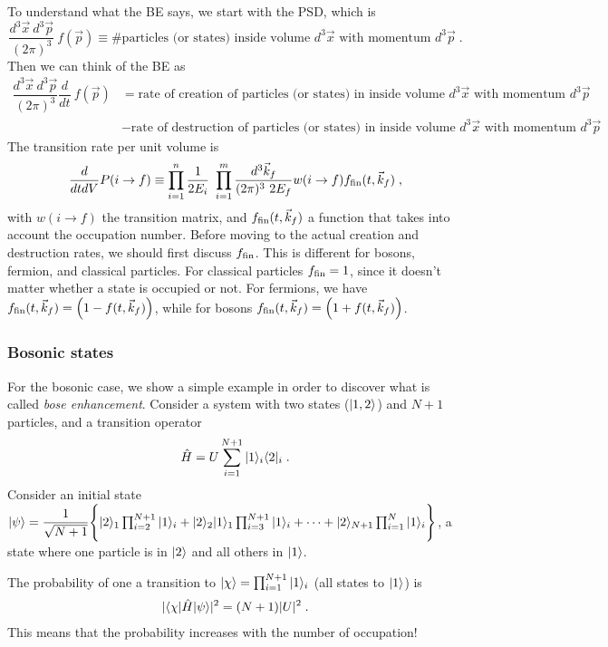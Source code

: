\documentclass[11pt,a4paper]{article}
\begin{document}
To understand what the BE says, we start with the PSD, which is
%
\begin{equation}
	\dfrac{d^3 \vec{x} \ d^3 \vec{p}}{(2\pi)^3} \ f(\vec{p})  \equiv \# \text{particles (or states) inside volume $d^3 \vec{x}$ with momentum $d^3 \vec{p}$} \;.
	\label{eq:PSD_description}
\end{equation}
%
Then we can think of the BE as  
%
\begin{align}
	\dfrac{d^3 \vec{x} \ d^3 \vec{p}}{(2\pi)^3}	\dfrac{d}{dt}  \ f(\vec{p})  &= 
	\text{rate of creation of particles (or states) in  inside volume $d^3 \vec{x}$ with momentum $d^3 \vec{p}$} \nonumber \\
	&-\text{rate of destruction of particles (or states) in  inside volume $d^3 \vec{x}$ with momentum $d^3 \vec{p}$} \;.
	\label{eq:BE_description}
\end{align}
%
The transition rate per unit volume is 
%
$$
\dfrac{d}{dt dV} P(i\to f) \equiv \prod_{i=1}^{n} \dfrac{1}{2E_{i}} \ \prod_{i=1}^{m} \dfrac{d^3\vec{k}_f}{(2\pi)^3 \ 2E_{f}}  w(i\to f) 
f_{\rm fin}(t,\vec{k}_f)  \;,
$$
%
with $w(i\to f)$ the transition matrix, and $f_{\rm fin}(t,\vec{k}_f)$ a function that takes into account the occupation number. Before moving to the actual creation and destruction rates, we should first discuss $f_{\rm fin}$. This is different for bosons, fermion, and classical particles. For classical particles $f_{\rm fin} = 1$, since it doesn't matter whether a state is occupied or not. For fermions, we have $f_{\rm fin}(t,\vec{k}_f) =\left( 1 -  f(t, \vec{k}_f )  \right)$, while for bosons $f_{\rm fin}(t,\vec{k}_f) = \left( 1 +  f(t, \vec{k}_f)  \right)$.


\subsubsection*{Bosonic states}
%
For the bosonic case, we show a simple example in order to discover what is called {\em bose enhancement}. Consider a system with two states ($| 1,2 \rangle$) and $N+1$ particles, and a transition operator
%
$$
\hat H = U \sum_{i=1}^{N+1} | 1 \rangle_i \langle 2 |_i \;.
$$
%
Consider an initial state $| \psi \rangle = \dfrac{1}{\sqrt{N+1}} \Bigg\{  | 2 \rangle_1   \prod_{i=2}^{N+1} | 1 \rangle_i + 
	| 2 \rangle_2 | 1 \rangle_1 \prod_{i=3}^{N+1} | 1 \rangle_i  + \cdots +  | 2 \rangle_{N+1} \prod_{i=1}^{N} | 1 \rangle_i  \Bigg\} $, \ie a state where
one particle is in $| 2 \rangle$ and all others in $| 1 \rangle$.

The probability of one a transition to $| \chi \rangle = \prod_{i=1}^{N+1} | 1 \rangle_i$ (\ie all states to $| 1 \rangle$) is
%
\begin{align*}
	|\langle \chi | \hat{H}  | \psi \rangle |^2 = (N+1) |U|^2 \;.
\end{align*}
%
This means that the probability increases with the number of occupation!
\end{document}
